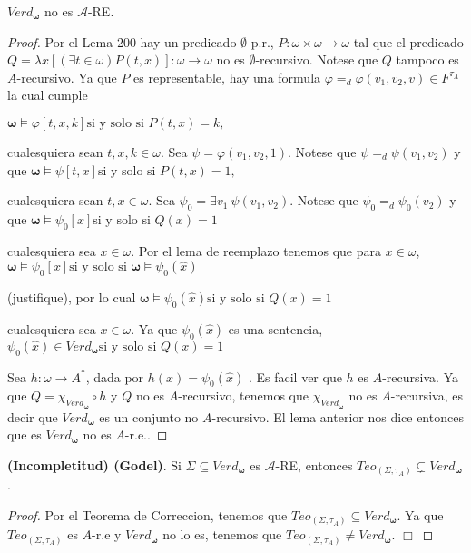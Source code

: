   \begin{lemma} \label{lemma_119}
    \PN $Verd_{\mathbf{\omega}}$ no es $\mathcal{A}$-RE.
  \end{lemma}
  \begin{proof}
    Por el Lema 200 hay un predicado $\emptyset $-p.r., $ P:\omega \times \omega \rightarrow \omega $ tal que el predicado $Q=\lambda x \left[ (\exists t\in \omega )P(t,x)\right] :\omega \rightarrow \omega $ no es $\emptyset $-recursivo. Notese que $Q$ tampoco es $A$-recursivo. Ya que $P $ es representable, hay una formula $\varphi =_{d}\varphi (v_{1},v_{2},v)\in F^{\tau _{A}}$ la cual cumple

    $\displaystyle \mathbf{\omega }\models \varphi \left[ t,x,k\right] \text{si y solo si } P(t,x)=k, $

    cualesquiera sean $t,x,k\in \omega .$ Sea $\psi =\varphi (v_{1},v_{2},1)$. Notese que $\psi =_{d}\psi (v_{1},v_{2})$ y que
    $\displaystyle \mathbf{\omega }\models \psi \left[ t,x\right] \text{si y solo si }P(t,x)=1 \text{,} $

    cualesquiera sean $t,x\in \omega .$ Sea $\psi_{0}=\exists v_{1}\ \psi (v_{1},v_{2})$. Notese que $\psi_{0}=_{d}\psi_{0}(v_{2})$ y que
    $\displaystyle \mathbf{\omega }\models \psi_{0}\left[ x\right] \text{si y solo si }Q(x)=1 $

    cualesquiera sea $x\in \omega $. Por el lema de reemplazo tenemos que para $ x\in \omega $,
    $\displaystyle \mathbf{\omega }\models \psi_{0}\left[ x\right] \text{si y solo si } \mathbf{\omega }\models \psi_{0}(\widehat{x}) $

    (justifique), por lo cual
    $\displaystyle \mathbf{\omega }\models \psi_{0}(\widehat{x})\text{si y solo si }Q(x)=1 $

    cualesquiera sea $x\in \omega $. Ya que $\psi_{0}(\widehat{x})$ es una sentencia,
    $\displaystyle \psi_{0}(\widehat{x})\in Verd_{\mathbf{\omega }}\text{si y solo si }Q(x)=1 $

    Sea $h:\omega \rightarrow A^{\ast }$, dada por $h(x)=\psi_{0}(\widehat{x})$ . Es facil ver que $h$ es $A$-recursiva. Ya que $Q=\chi _{Verd_{\mathbf{ \omega }}}\circ h$ y $Q$ no es $A$-recursivo, tenemos que $\chi _{Verd_{ \mathbf{\omega }}}$ no es $A$-recursiva, es decir que $Verd_{\mathbf{\omega } }$ es un conjunto no $A$-recursivo. El lema anterior nos dice entonces que es $Verd_{\mathbf{\omega }}$ no es $A$-r.e..
  \end{proof}

  \begin{theorem} \label{theorem_120}
    \PN \textbf{(Incompletitud) (Godel)}. Si $\Sigma \subseteq Verd_{\mathbf{\omega}}$ es $\mathcal{A}$-RE, entonces
    $Teo_{(\Sigma, \tau_{A})} \subsetneq Verd_{\mathbf{\omega}}$.
  \end{theorem}
  \begin{proof}
    Por el Teorema de Correccion, tenemos que $Teo_{(\Sigma ,\tau _{A})}\subseteq Verd_{\mathbf{\omega }}$. Ya que $Teo_{(\Sigma ,\tau _{A})}$ es $A$-r.e y $Verd_{\mathbf{\omega }}$ no lo es, tenemos que $Teo_{(\Sigma ,\tau _{A})}\neq Verd_{\mathbf{\omega }}$. $\Box$
  \end{proof}

